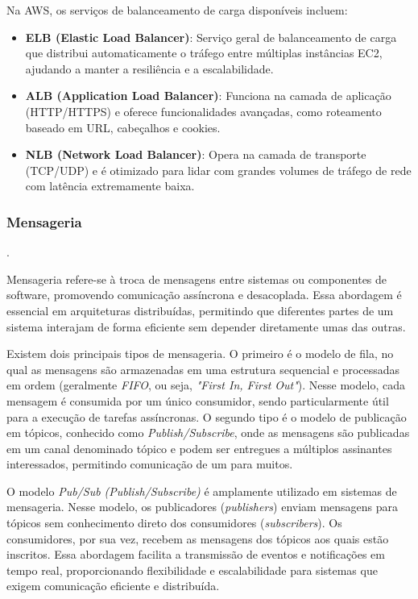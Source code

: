 Na AWS, os serviços de balanceamento de carga disponíveis incluem:

\begin{itemize}
    \item \textbf{ELB (Elastic Load Balancer)}: Serviço geral de balanceamento de carga que distribui automaticamente o tráfego entre múltiplas instâncias EC2, ajudando a manter a resiliência e a escalabilidade.
    \item \textbf{ALB (Application Load Balancer)}: Funciona na camada de aplicação (HTTP/HTTPS) e oferece funcionalidades avançadas, como roteamento baseado em URL, cabeçalhos e cookies.
    \item \textbf{NLB (Network Load Balancer)}: Opera na camada de transporte (TCP/UDP) e é otimizado para lidar com grandes volumes de tráfego de rede com latência extremamente baixa.
\end{itemize}

\subsubsection{Mensageria}
.

Mensageria refere-se à troca de mensagens entre sistemas ou componentes de software, promovendo comunicação assíncrona e desacoplada. Essa abordagem é essencial em arquiteturas distribuídas, permitindo que diferentes partes de um sistema interajam de forma eficiente sem depender diretamente umas das outras.

Existem dois principais tipos de mensageria. O primeiro é o modelo de fila, no qual as mensagens são armazenadas em uma estrutura sequencial e processadas em ordem (geralmente \emph{FIFO}, ou seja, \emph{"First In, First Out"}). Nesse modelo, cada mensagem é consumida por um único consumidor, sendo particularmente útil para a execução de tarefas assíncronas. O segundo tipo é o modelo de publicação em tópicos, conhecido como \emph{Publish/Subscribe}, onde as mensagens são publicadas em um canal denominado tópico e podem ser entregues a múltiplos assinantes interessados, permitindo comunicação de um para muitos.

O modelo \emph{Pub/Sub (Publish/Subscribe)} é amplamente utilizado em sistemas de mensageria. Nesse modelo, os publicadores (\emph{publishers}) enviam mensagens para tópicos sem conhecimento direto dos consumidores (\emph{subscribers}). Os consumidores, por sua vez, recebem as mensagens dos tópicos aos quais estão inscritos. Essa abordagem facilita a transmissão de eventos e notificações em tempo real, proporcionando flexibilidade e escalabilidade para sistemas que exigem comunicação eficiente e distribuída.

